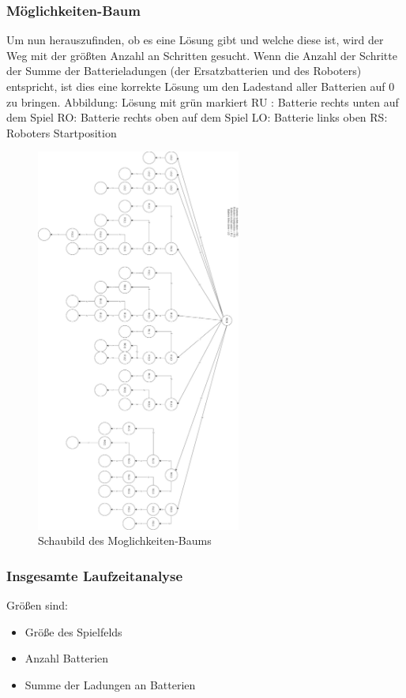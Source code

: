 \documentclass[a4paper,12pt,arial]{scrartcl}
\begin{document}
\subsubsection{Möglichkeiten-Baum}
Um nun herauszufinden, ob es eine Lösung gibt und welche diese ist, wird der Weg mit der größten Anzahl an Schritten gesucht. Wenn die Anzahl der Schritte der Summe der Batterieladungen (der Ersatzbatterien und des Roboters) entspricht, ist dies eine korrekte Lösung um den Ladestand aller Batterien auf 0 zu bringen.
Abbildung:
Lösung mit grün markiert
    RU : Batterie rechts unten auf dem Spiel
    RO: Batterie rechts oben auf dem Spiel
    LO: Batterie links oben
    RS: Roboters Startposition
\par
\newpage

\begin{figure}[htpb]
    \centering
    \includegraphics[width=0.6\textwidth]{rotated_baum_yeah.jpg}
    \caption{Schaubild des Moglichkeiten-Baums
    }
    \label{fig:moeglichkeiten_baum}
\end{figure}

\newpage

\subsubsection{Insgesamte Laufzeitanalyse}
Größen sind:
\begin{itemize}
    \item Größe des Spielfelds
    \item Anzahl Batterien
    \item Summe der Ladungen an Batterien
\end{itemize}
\end{document}

